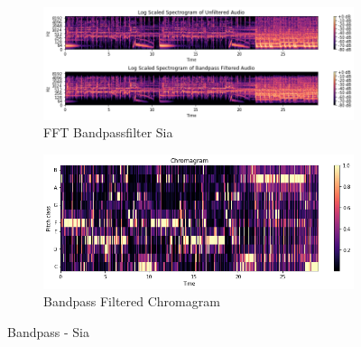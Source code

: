 \begin{figure}[htbp]
{{			\begin{subfigure}{.495\textwidth}
				\centering
				\includegraphics[scale=0.3]{Images/Chroma/siafft.png}
				\caption{FFT Bandpassfilter Sia}
				\label{siafft}
			\end{subfigure}%
			\begin{subfigure}{.495\textwidth}
				\centering
				\includegraphics[scale=0.3]{Images/Chroma/chroma_bp.png}
				\caption{Bandpass Filtered Chromagram}
				\label{pvfft}
			\end{subfigure}%
	}}
	\caption{Bandpass - Sia}
	\label{fig:sia2}
\end{figure}

